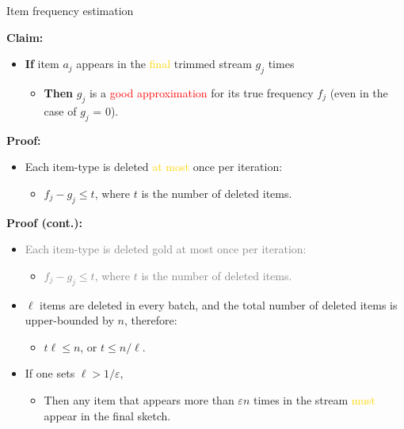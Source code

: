 \documentclass[first=dgreen,second=purple,logo=redque]{aaltoslides}
\begin{document}
\begin{frame}[allowframebreaks=1]{Item frequency estimation}
\framebreak

\textbf{Claim:}

\begin{itemize}
\item \textbf{If} item $a_{j}$ appears in the \textcolor{gold}{final} trimmed
stream $g_{j}$ times
\begin{itemize}
  \item \textbf{Then} $g_{j}$ is a \textcolor{red}{good approximation} for its
  true frequency $f_{j}$ (even in the case of $g_{j}$ = 0).
\end{itemize}         
\end{itemize}

\textbf{Proof:}
\begin{itemize}
   \item Each item-type is deleted \textcolor{gold}{at most} once per iteration:
   \begin{itemize} \item $f_{j} - g_{j} \leq t$, where $t$ is the
   number of deleted items.\end{itemize}
\end{itemize}

\framebreak

\textbf{Proof (cont.):}

\begin{itemize}
   \item \textcolor{gray}{Each item-type is deleted gold at most
   once per iteration:}
   \begin{itemize} \item \textcolor{gray}{$f_{j} - g_{j} \leq t$, where $t$ is
   the number of deleted items.}\end{itemize}
   \item $\ell$ items are deleted in every batch, and the total number of
   deleted items is upper-bounded by $n$, therefore:
   \begin{itemize} \item $t\ell \leq n$, or $t \leq n/\ell$.\end{itemize} 
\end{itemize}

\begin{itemize}
  \item If one sets $\ell > 1/\varepsilon$,
  \begin{itemize} \item Then any item that appears more than
  $\varepsilon n$ times in the stream \textcolor{gold}{must} appear in
  the final sketch.\end{itemize}
\end{itemize}
  
\end{frame}
\end{document}
